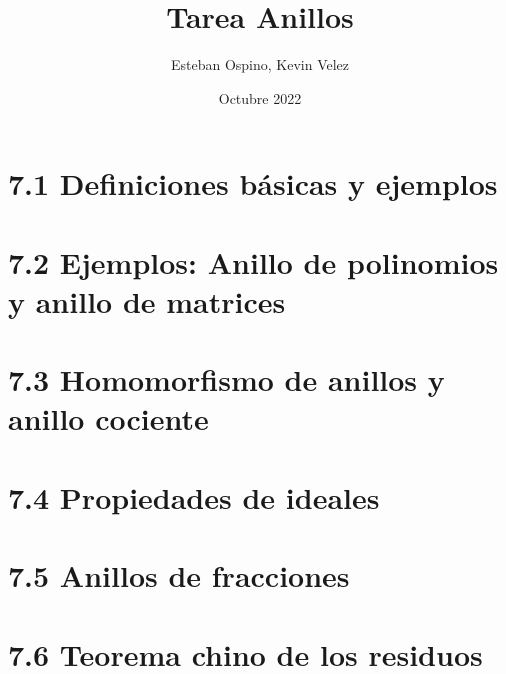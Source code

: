 \documentclass{amsart}
\title{Tarea Anillos}
\author{Esteban Ospino, Kevin Velez}
\date{Octubre 2022}
\begin{document}
\maketitle \thispagestyle{fancy}

\section*{7.1 Definiciones básicas y ejemplos}
% 
% 
% 
% 

\section*{7.2 Ejemplos: Anillo de polinomios y anillo de matrices}
% 
% 
% 

\section*{7.3 Homomorfismo de anillos y anillo cociente}
% 
% 
% 
% 
% 
% 
% 
% 

\section*{7.4 Propiedades de ideales}
% 
% 
% 
% 
% 
% 

\section*{7.5 Anillos de fracciones}
% 


\section*{7.6 Teorema chino de los residuos}
% 
% 
\end{document}
